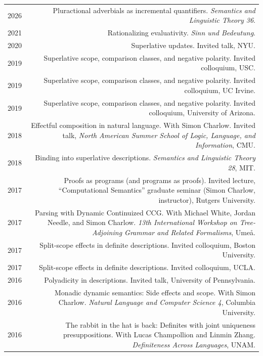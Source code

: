\documentclass[12pt]{article}
\begin{document}
\begin{longtable}{LR}
  2026 & Pluractional adverbials as incremental quantifiers.
         \textit{Semantics and Linguistic Theory 36}.\\
  2021 & Rationalizing evaluativity.
         \textit{Sinn und Bedeutung}.\\
  2020 & Superlative updates.
         Invited talk, NYU.\\
  2019 & Superlative scope, comparison classes, and negative polarity.
         Invited colloquium, USC.\\
  2019 & Superlative scope, comparison classes, and negative polarity.
         Invited colloquium, UC Irvine.\\
  2019 & Superlative scope, comparison classes, and negative polarity.
         Invited colloquium, University of Arizona.\\
  2018 & Effectful composition in natural language.
         With Simon Charlow.
         Invited talk, \textit{North American Summer School of Logic, Language,
         and Information}, CMU.\\
  2018 & Binding into superlative descriptions.
         \textit{Semantics and Linguistic Theory 28}, MIT.\\
  2017 & Proofs as programs (and programs as proofs).
         Invited lecture, ``Computational Semantics''
         graduate seminar (Simon Charlow, instructor), Rutgers University.\\
  2017 & Parsing with Dynamic Continuized CCG.
         With Michael White, Jordan Needle, and Simon Charlow.
         \textit{13th International Workshop on Tree-Adjoining Grammar and
         Related Formalisms}, Ume\aa.\\
  2017 & Split-scope effects in definite descriptions.
         Invited colloquium, Boston University.\\
  2017 & Split-scope effects in definite descriptions.
         Invited colloquium, UCLA.\\
  2016 & Polyadicity in descriptions.
         Invited talk, University of Pennsylvania.\\
  2016 & Monadic dynamic semantics: Side effects and scope.
         With Simon Charlow.
         \textit{Natural Language and Computer Science 4}, Columbia University.\\
  2016 & The rabbit in the hat is back: Definites with joint uniqueness
         presuppositions.
         With Lucas Champollion and Linmin Zhang.
         \textit{Definiteness Across Languages}, UNAM.\\

\end{longtable}
\end{document}

